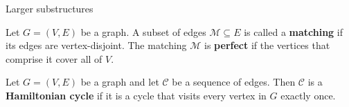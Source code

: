 \documentclass{beamer}
\theoremstyle{plain}
\begin{document}
	\begin{frame}{Larger substructures}
		\begin{definition}
			Let $G = (V, E)$ be a graph.
			A subset of edges $\mathcal{M}\subseteq E$ is called a \textbf{matching} if its edges are vertex-disjoint.
			The matching $\mathcal{M}$ is \textbf{perfect} if the vertices that comprise it cover all of $V$.
		\end{definition}

		\pause

		\begin{definition}
			Let $G = (V, E)$ be a graph and let $\mathcal{C}$ be a sequence of edges.
			Then $\mathcal{C}$ is a \textbf{Hamiltonian cycle} if it is a cycle that visits every vertex in $G$ exactly once.
		\end{definition}

	\end{frame}
\end{document}

